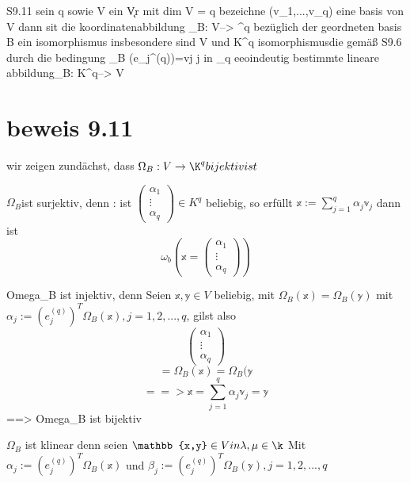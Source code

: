 \documentclass[11pt]{article}
\begin{document}
{S9.11
sein q \elem \N sowie V ein \k Vr mit dim V = q bezeichne (v_1,...,v_q) eine basis von V dann sit die koordinatenabbildung \Omega_B: V--> \K^q bezüglich der geordneten
basis B ein isomorphismus insbesondere sind V und K^q
isomorphismusdie gemäß S9.6 durch die bedingung \Phi_B (e_j^{(q)})=vj \forall j in \Z_q eeoindeutig bestimmte lineare abbildung\OPh _B: K^q--> V

\section{beweis 9.11}
wir zeigen zundächst, dass $\Omega_B: V \rightarrow \K^q bijektiv ist $
\begin{item}
 \item $\Omega_B $ist surjektiv, denn : ist 
 $
 \begin{pmatrix}
  \alpha_1\\ \vdots\\ \alpha_q
 \end{pmatrix}
\in K^q
 $
 beliebig, so erfüllt $\mathbb{x}:= \sum_{j=1}^{q}\alpha_j \mathbb{v}_j$ dann ist 
\[ \omega_b(\mathbb{x}=
 \begin{pmatrix}
  \alpha_1\\ \vdots\\ \alpha_q
 \end{pmatrix})\]
 \item Omega_B ist injektiv, denn Seien $\mathbb{x,y}\in V$ beliebig, mit $\Omega_B(\mathbb{x})=\Omega_B(\mathbb{y})$
 mit $\alpha_j := (e_j^(q))^T\Omega_B(\mathbb{x}), j=1,2,..., q$, gilst also  
 \[\begin{pmatrix}
  \alpha_1\\ \vdots\\ \alpha_q
 \end{pmatrix}\]
\[ =\Omega_B(\mathbb{x})=\Omega_B(\mathbb{y}
\]
\[==> \mathbb{x}=\sum_{j=1}^{q}\alpha_j \mathbb{v}_j= \mathbb{y}
\] ==> Omega_B ist bijektiv
 \item
 $\Omega_B $ ist klinear denn seien $\mathbb{x,y}\in V in \lambda, \mu \in \k$ Mit $\alpha_j := (e_j^(q))^T\Omega_B(\mathbb{x})$ und $\beta_j:= (e_j^(q))^T\Omega_B(\mathbb{y}),j=1,2,..., q$
  

\end{item}}
\end{document}
